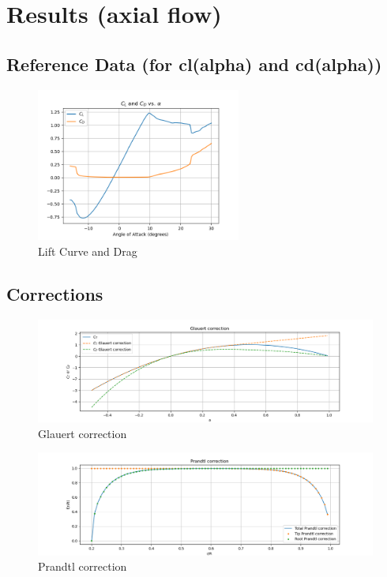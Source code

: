 \chapter{Results (axial flow)}

\section{Reference Data (for cl(alpha) and cd(alpha))}
\begin{figure}[H]
    \centering
    \includegraphics[width=0.6\textwidth]{Figures/CLCD_interpolation.png}
    \caption{Lift Curve and Drag}
    \label{fig:lift curve and drag}
\end{figure}

\section{Corrections}
\begin{figure}[H]
    \centering
    \includegraphics[width=\textwidth]{Figures/Glauert_correct.png}
    \caption{Glauert correction}
    \label{fig:glauert correction}
\end{figure}
\begin{figure}[H]
    \centering
    \includegraphics[width=\textwidth]{Figures/prandtl_correct.png}
    \caption{Prandtl correction}
    \label{fig:prandtl correction}
\end{figure}

